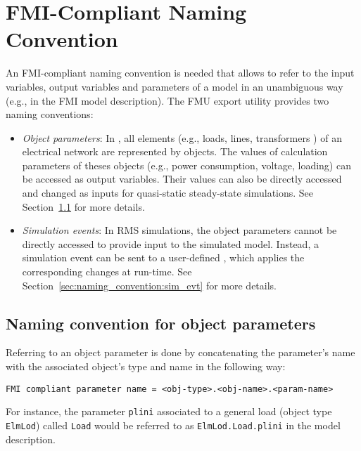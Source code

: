 
\chapter{FMI-Compliant Naming Convention}
\label{sec:naming_convention}

An FMI-compliant naming convention is needed that allows to refer to the input variables, output variables and parameters of a \pf model in an unambiguous way (e.g., in the FMI model description).
The \fmipp \pf FMU export utility provides two naming conventions:
\begin{itemize}

  \item \emph{Object parameters}: In \pf, all elements (e.g., loads, lines, transformers ) of an electrical network are represented by objects.
  The values of calculation parameters of theses objects (e.g., power consumption, voltage, loading) can be accessed as output variables.
  Their values can also be directly accessed and changed as inputs for quasi-static steady-state simulations.
  See Section~\ref{sec:naming_convention:obj_param} for more details.

  \item \emph{Simulation events}: In RMS simulations, the object parameters cannot be directly accessed to provide input to the simulated model.
  Instead, a simulation event can be sent to a user-defined \dslmodel, which applies the corresponding changes at run-time.
  See Section~\ref{sec:naming_convention:sim_evt} for more details.
\end{itemize}


\section{Naming convention for object parameters}
\label{sec:naming_convention:obj_param}

Referring to an object parameter is done by concatenating the parameter's name with the associated object's type and name in the following way:
\begin{verbatim}
FMI compliant parameter name = <obj-type>.<obj-name>.<param-name>
\end{verbatim}

For instance, the parameter \texttt{plini} associated to a general load (object type \texttt{ElmLod}) called \texttt{Load} would be referred to as \texttt{ElmLod.Load.plini} in the model description.


